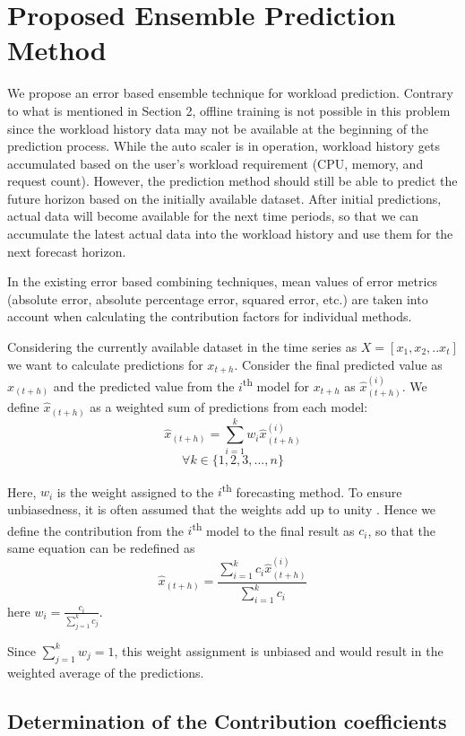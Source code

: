 \section{Proposed Ensemble Prediction Method}

We propose an error based ensemble technique for workload prediction. Contrary to what is mentioned in Section 2, offline training is not possible in this problem since the workload history data may not be available at the beginning of the prediction process. While the auto scaler is in operation, workload history gets accumulated based on the user's workload requirement (CPU, memory, and request count). However, the prediction method should still be able to predict the future horizon based on the initially available dataset. After initial predictions, actual data will become available for the next time periods, so that we can accumulate the latest actual data into the workload history and use them for the next forecast horizon.

In the existing error based combining techniques, mean values of error metrics (absolute error, absolute percentage error, squared error, etc.) are taken into account when calculating the contribution factors for individual methods. 

Considering the currently available dataset in the time series as
$X=[x_{1},x_{2},.. x_{t}]$
we want to calculate predictions for $x_{t+h}$. Consider the final predicted value as $\hat{x}_{(t+h)}$ and the predicted value from the $i$\textsuperscript{th} model for $x_{t+h}$ as $\hat{x}_{(t+h)}^{(i)}$. We define $\hat{x}_{(t+h)}$ as a weighted sum of predictions from each model:
$$\hat{x}_{(t+h)}= \sum_{i=1}^{k}w_i \hat{x}_{(t+h)}^{(i)}$$   $$\forall k \in \{1,2,3,...,n\}$$

Here, $w_i$ is the weight assigned to the $i$\textsuperscript{th} forecasting method. To ensure unbiasedness, it is often assumed that the weights add up to unity \cite{Adhikari_2012}. Hence we define the contribution from the $i$\textsuperscript{th} model to the final result as $c_i$, so that the same equation can be redefined as  
$$\hat{x}_{(t+h)}= \frac{\sum_{i=1}^{k}c_i \hat{x}_{(t+h)}^{(i)}}{\sum_{i=1}^{k}c_i}$$
here $w_{i}= \frac{c_{i}}{\sum_{j=1}^{k}c_j}$.

Since $\sum_{j=1}^{k}w_{j}=1$, this weight assignment is unbiased and would result in the weighted average of the predictions.

\subsection{Determination of the Contribution coefficients}

